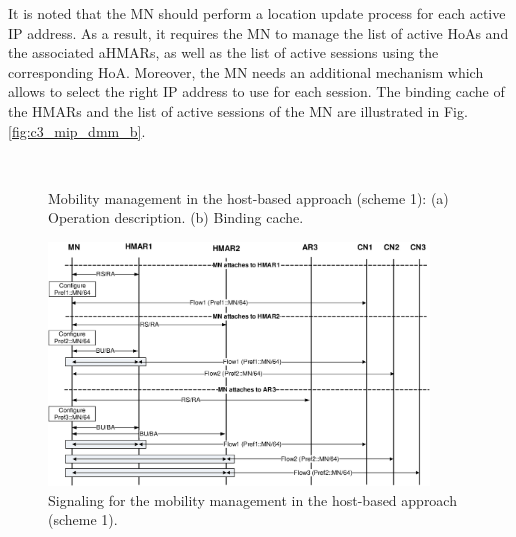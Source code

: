 It is noted that the MN should perform a location update process for each active IP address. As a result, it requires the MN to manage the list of active HoAs and the associated aHMARs, as well as the list of active sessions using the corresponding HoA. Moreover, the MN needs an additional mechanism which allows to select the right IP address to use for each session. The binding cache of the HMARs and the list of active sessions of the MN are illustrated in Fig.\ref{fig:c3_mip_dmm_b}.
\begin{figure}[h!]
\centering
{}\,\,\,\,\,\,
\caption[Mobility management in the host-based approach (scheme 1).]{Mobility management in the host-based approach (scheme 1): (a) Operation description. (b) Binding cache.}
\label{fig:c3_mip_dmm}
\end{figure}
\begin{figure}[h!] 
 \begin{center} 
 \includegraphics[width=0.9\textwidth]{./Part1/Chapter2/figures/c3_mip_dmm_signaling.eps} 
    \caption{Signaling for the mobility management in the host-based approach (scheme 1).}
     \label{fig:c3_mip_dmm_signaling}
  \end{center} 
\end{figure}


